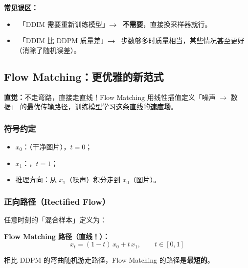 \begin{warnbox}
\textbf{常见误区：}
\begin{itemize}
  \item {}~「DDIM 需要重新训练模型」\;\textbf{→}\;
        ~\textbf{不需要}，直接换采样器就行。
  \item {}~「DDIM 比 DDPM 质量差」\;\textbf{→}\;
        ~步数够多时质量相当，某些情况甚至更好（消除了随机误差）。
\end{itemize}
\end{warnbox}

\subsection{Flow Matching：更优雅的新范式}

\begin{intubox}
\textbf{直觉：}不走弯路，直接走直线！Flow Matching 用线性插值定义「噪声 $\to$ 数据」
的最优传输路径，训练模型学习这条直线的\textbf{速度场}。
\end{intubox}

\subsubsection*{符号约定}

\begin{warnbox}
\begin{itemize}
  \item $x_0$：（干净图片），$t = 0$；
  \item $x_1$：，$t = 1$；
  \item 推理方向：从 $x_1$（噪声）积分走到 $x_0$（图片）。
\end{itemize}
\end{warnbox}

\subsubsection*{正向路径（Rectified Flow）}

任意时刻的「混合样本」定义为：

\begin{conceptbox}
\textbf{Flow Matching 路径（直线！）：}
$$x_t = (1-t)\,x_0 + t\,x_1, \qquad t \in [0, 1]$$

相比 DDPM 的弯曲随机游走路径，Flow Matching 的路径是\textbf{最短的}。
\end{conceptbox}

